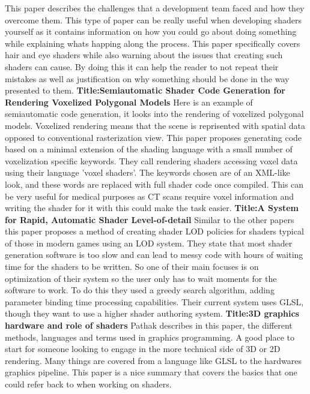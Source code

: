 \documentclass{scrartcl}
\begin{document}
	\newline
This paper describes the challenges that a development team faced and how they overcome them. This type of paper can be really useful when developing shaders yourself as it contains information on how you could go about doing something while explaining whats happing along the process. This paper specifically covers hair and eye shaders while also warning about the issues that creating such shaders can cause. By doing this it can help the reader to not repeat their mistakes as well as justification on why something should be done in the way presented to them.
	\newline
	\newline
	\newline
	\textbf{Title:Semiautomatic Shader Code Generation for Rendering Voxelized Polygonal Models}\cite{Fische}
	\newline
Here is an example of semiautomatic code generation, it looks into the rendering of voxelized polygonal models. Voxelized rendering means that the scene is reprisented with spatial data opposed to conventional rasterization view. This paper proposes generating code based on a minimal extension of the shading language with a small number of voxelization specific keywords. They call rendering shaders accessing voxel data using their language 'voxel shaders'. The keywords chosen are of an XML-like look, and these words are replaced with full shader code once compiled. This can be very useful for medical purposes as CT scans require voxel information and writing the shader for it with this could make the task easier.
	\newline
	\newline
	\newline
	\textbf{Title:A System for Rapid, Automatic Shader Level-of-detail}\cite{He:2015}
	\newline
Similar to the other papers this paper proposes a method of creating shader LOD policies for shaders typical of those in modern games using an LOD system. They state that most shader generation software is too slow and can lead to messy code with hours of waiting time for the shaders to be written. So one of their main focuses is on optimization of their system so the user only has to wait moments for the software to work. To do this they used a greedy search algorithm, adding parameter binding time processing capabilities. Their current system uses GLSL, though they want to use a higher shader authoring system.
	\newline
	\newline
	\newline
	\textbf{Title:3D graphics hardware and role of shaders}\cite{Pathak}
	\newline
Pathak describes in this paper, the different methods, languages and terms used in graphics programming. A good place to start for someone looking to engage in the more technical side of 3D or 2D rendering. Many things are covered from a language like GLSL to the hardwares graphics pipeline. This paper is a nice summary that covers the basics that one could refer back to when working on shaders.
	
	
	
	
	
\end{document}
